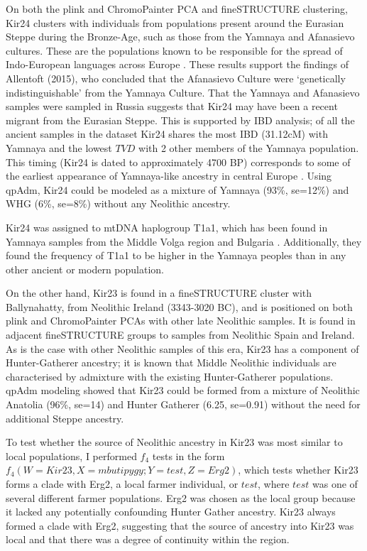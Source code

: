 On both the plink and ChromoPainter PCA and fineSTRUCTURE clustering, Kir24 clusters with individuals from populations present around the Eurasian Steppe during the Bronze-Age, such as those from the Yamnaya and Afanasievo cultures. These are the populations known to be responsible for the spread of Indo-European languages across Europe \cite{Haak2015}. These results support the findings of Allentoft (2015), who concluded that the Afanasievo Culture were `genetically indistinguishable' from the Yamnaya Culture. That the Yamnaya and Afanasievo samples were sampled in Russia suggests that Kir24 may have been a recent migrant from the Eurasian Steppe. This is supported by IBD analysis; of all the ancient samples in the dataset Kir24 shares the most IBD (31.12cM) with Yamnaya and the lowest $TVD$ with 2 other members of the Yamnaya population. This timing (Kir24 is dated to approximately 4700 BP) corresponds to some of the earliest appearance of Yamnaya-like ancestry in central Europe \cite{Racimo8989}. Using qpAdm, Kir24 could be modeled as a mixture of Yamnaya (93\%, se=12\%) and WHG (6\%, se=8\%) without any Neolithic ancestry. 

Kir24 was assigned to mtDNA haplogroup T1a1, which has been found in Yamnaya samples from the Middle Volga region and Bulgaria \cite{keyser2009ancient}. Additionally, they found the frequency of T1a1 to be higher in the Yamnaya peoples than in any other ancient or modern population. 

On the other hand, Kir23 is found in a fineSTRUCTURE cluster with Ballynahatty, from Neolithic Ireland (3343-3020 BC), and is positioned on both plink and ChromoPainter PCAs with other late Neolithic samples. It is found in adjacent fineSTRUCTURE groups to samples from Neolithic Spain and Ireland. As is the case with other Neolithic samples of this era, Kir23 has a component of Hunter-Gatherer ancestry; it is known that Middle Neolithic individuals are characterised by admixture with the existing Hunter-Gatherer populations. qpAdm modeling showed that Kir23 could be formed from a mixture of Neolithic Anatolia (96\%, se=14)  and Hunter Gatherer (6.25, se=0.91) without the need for additional Steppe ancestry. 

To test whether the source of Neolithic ancestry in Kir23 was most similar to local populations, I performed $f_{4}$ tests in the form $f_{4}(W=Kir23, X=mbutipygy; Y=test, Z=Erg2)$, which tests whether Kir23 forms a clade with Erg2, a local farmer individual, or $test$, where $test$ was one of several different farmer populations. Erg2 was chosen as the local group because it lacked any potentially confounding Hunter Gather ancestry. Kir23 always formed a clade with Erg2, suggesting that the source of ancestry into Kir23 was local and that there was a degree of continuity within the region. 


